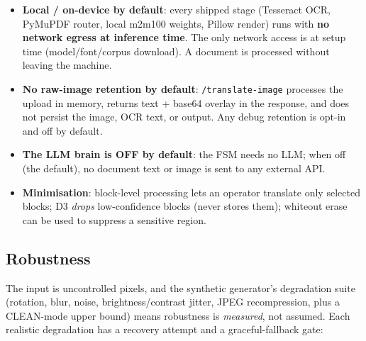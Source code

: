 \documentclass[12pt,a4paper]{article}
\begin{document}
\begin{itemize}\setlength\itemsep{0.15em}
  \item \textbf{Local / on-device by default}: every shipped stage (Tesseract OCR, PyMuPDF router, local m2m100 weights, Pillow render) runs with \textbf{no network egress at inference time}. The only network access is at setup time (model/font/corpus download). A document is processed without leaving the machine.
  \item \textbf{No raw-image retention by default}: \texttt{/translate-image} processes the upload in memory, returns text + base64 overlay in the response, and does not persist the image, OCR text, or output. Any debug retention is opt-in and off by default.
  \item \textbf{The LLM brain is OFF by default}: the FSM needs no LLM; when off (the default), no document text or image is sent to any external API.
  \item \textbf{Minimisation}: block-level processing lets an operator translate only selected blocks; D3 \emph{drops} low-confidence blocks (never stores them); whiteout erase can be used to suppress a sensitive region.
\end{itemize}

\subsection{Robustness}

The input is uncontrolled pixels, and the synthetic generator's degradation suite (rotation, blur, noise, brightness/contrast jitter, JPEG recompression, plus a CLEAN-mode upper bound) means robustness is \emph{measured}, not assumed. Each realistic degradation has a recovery attempt and a graceful-fallback gate:
\end{document}
